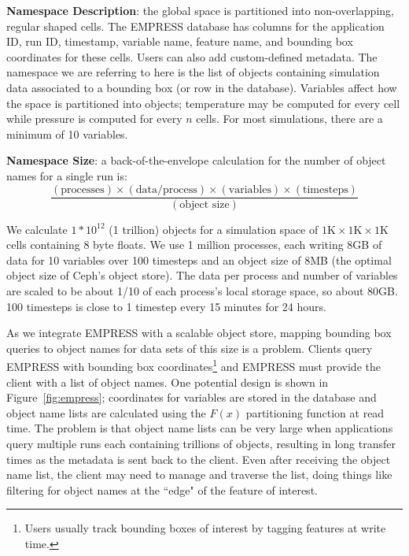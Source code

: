 \textbf{Namespace Description}: the global space is partitioned into
non-overlapping, regular shaped cells.  The EMPRESS database has columns for
the application ID, run ID, timestamp, variable name, feature name, and
bounding box coordinates for these cells. Users can also add custom-defined
metadata.  The namespace we are referring to here is the list of objects
containing simulation data associated to a bounding box (or row in the
database).  Variables affect how the space is partitioned into objects;
temperature may be computed for every cell while pressure is computed for every
\(n\) cells. For most simulations, there are a minimum of 10 variables. 

\textbf{Namespace Size}: a back-of-the-envelope calculation for the number of
object names for a single run is:
\[\frac
  {(\text{processes})\times
   (\text{data/process})\times
   (\text{variables})\times
   (\text{timesteps})}
  {(\text{object size})}
\]

We calculate \(1*10^{12}\) (1 trillion) objects for a simulation space of
\(1\text{K}\times1\text{K}\times1\text{K}\) cells containing 8 byte floats.  We
use 1 million processes, each writing 8GB of data for 10 variables over 100
timesteps and an object size of 8MB (the optimal object size of Ceph's object
store).  The data per process and number of variables are scaled to be about
1/10 of each process's local storage space, so about 80GB. 100 timesteps is
close to 1 timestep every 15 minutes for 24 hours. 

As we integrate EMPRESS with a scalable object store, mapping bounding box
queries to object names for data sets of this size is a problem. Clients query
EMPRESS with bounding box coordinates\footnote{Users usually track bounding
boxes of interest by tagging features at write time.} and EMPRESS must provide
the client with a list of object names.  One potential design is shown in
Figure~\ref{fig:empress}; coordinates for variables are stored in the database
and object name lists are calculated using the \(F(x)\) partitioning function
at read time.  The problem is that object name lists can be very large when
applications query multiple runs each containing trillions of objects,
resulting in long transfer times as the metadata is sent back to the client.
Even after receiving the object name list, the client may need to manage and
traverse the list, doing things like filtering for object names at the ``edge"
of the feature of interest.


